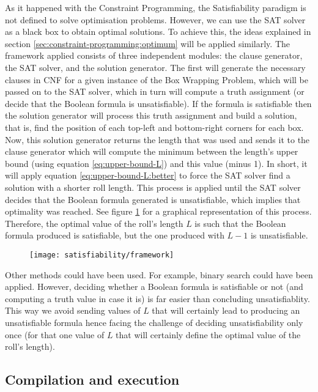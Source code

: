 As it happened with the Constraint Programming, the Satisfiability paradigm is not
defined to solve optimisation problems. However, we can use the SAT solver as a
black box to obtain optimal solutions. To achieve this, the ideas explained in
section \ref{sec:constraint-programming:optimum} will be applied similarly.
The framework applied consists of three independent modules: the clause generator,
the SAT solver, and the solution generator. The first will generate the necessary
clauses in CNF for a given instance of the Box Wrapping Problem, which will be passed
on to the SAT solver, which in turn will compute a truth assignment (or decide that the
Boolean formula is unsatisfiable). If the formula is satisfiable then the solution
generator will process this truth assignment and build a solution, that is, find
the position of each top-left and bottom-right corners for each box. Now, this
solution generator returns the length that was used and sends it to the clause generator
which will compute the minimum between the length's upper bound (using equation
\ref{eq:upper-bound-L}) and this value (minus 1). In short, it will apply equation
\ref{eq:upper-bound-L:better} to force the SAT solver find a solution with a shorter
roll length. This process is applied until the SAT solver decides that the Boolean
formula generated is unsatisfiable, which implies that optimality was reached.
See figure \ref{fig:satisfiability:framework} for a graphical representation of this
process. Therefore, the optimal value of the roll's length $L$ is such that the Boolean
formula produced is satisfiable, but the one produced with $L - 1$ is unsatisfiable.

\begin{figure}[H]
	\centering
	\texttt{[image: satisfiability/framework]}
	\label{fig:satisfiability:framework}
\end{figure}

Other methods could have been used. For example, binary search could have been applied.
However, deciding whether a Boolean formula is satisfiable or not (and computing a
truth value in case it is) is far easier than concluding unsatisfiablity. This way
we avoid sending values of $L$ that will certainly lead to producing an unsatisfiable
formula hence facing the challenge of deciding unsatisfiability only once (for that
one value of $L$ that will certainly define the optimal value of the roll's length).

\subsection{Compilation and execution}
\label{sec:satisfiability:compilation-execution}

